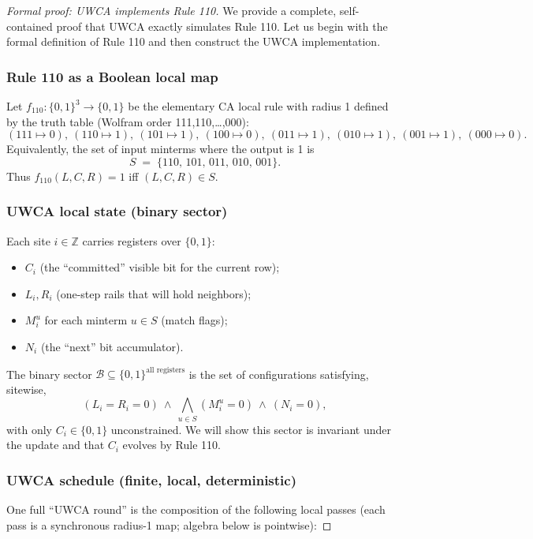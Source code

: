 \documentclass[12pt]{article}
\numberwithin{equation}{section}
\begin{document}
\begin{proof}[Formal proof: UWCA implements Rule 110]
We provide a complete, self-contained proof that UWCA exactly simulates Rule 110. Let us begin with the formal definition of Rule 110 and then construct the UWCA implementation.

\subsubsection*{Rule 110 as a Boolean local map}

Let $f_{110}:\{0,1\}^3\to\{0,1\}$ be the elementary CA local rule with radius 1 defined by the truth table (Wolfram order 111,110,\dots,000):
\[
(111\!\mapsto\!0),\ (110\!\mapsto\!1),\ (101\!\mapsto\!1),\ (100\!\mapsto\!0),\ (011\!\mapsto\!1),\ (010\!\mapsto\!1),\ (001\!\mapsto\!1),\ (000\!\mapsto\!0).
\]
Equivalently, the set of input minterms where the output is 1 is
\[
S \;=\; \{110,\,101,\,011,\,010,\,001\}.
\]
Thus $f_{110}(L,C,R)=1$ iff $(L,C,R)\in S$.

\subsubsection*{UWCA local state (binary sector)}

Each site $i\in\mathbb Z$ carries registers over $\{0,1\}$:
\begin{itemize}[leftmargin=1.1em]
  \item $C_i$ (the ``committed'' visible bit for the current row);
  \item $L_i,R_i$ (one-step rails that will hold neighbors);
  \item $M^{u}_i$ for each minterm $u\in S$ (match flags);
  \item $N_i$ (the ``next'' bit accumulator).
\end{itemize}

The binary sector $\mathcal B\subseteq\{0,1\}^{\text{all registers}}$ is the set of configurations satisfying, sitewise,
\[
(L_i=R_i=0)\ \wedge\ \bigwedge_{u\in S} (M^u_i=0)\ \wedge\ (N_i=0),
\]
with only $C_i\in\{0,1\}$ unconstrained. We will show this sector is invariant under the update and that $C_i$ evolves by Rule 110.

\subsubsection*{UWCA schedule (finite, local, deterministic)}

One full ``UWCA round'' is the composition of the following local passes (each pass is a synchronous radius-1 map; algebra below is pointwise):


\end{proof}
\end{document}
